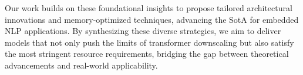 Our work builds on these foundational insights to propose tailored architectural innovations and memory-optimized techniques, advancing the SotA for embedded NLP applications. By synthesizing these diverse strategies, we aim to deliver models that not only push the limits of transformer downscaling but also satisfy the most stringent resource requirements, bridging the gap between theoretical advancements and real-world applicability.


